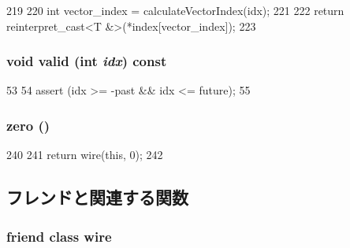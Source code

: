 \begin{DoxyCode}
219     {
220         int vector_index = calculateVectorIndex(idx);
221 
222         return reinterpret_cast<T &>(*index[vector_index]);
223     }
\end{DoxyCode}
\hypertarget{classTimeBuffer_ab099fd18174f884c6ac2f044b15a339b}{
\subsubsection[{valid}]{\setlength{\rightskip}{0pt plus 5cm}void valid (int {\em idx}) const}}
\label{classTimeBuffer_ab099fd18174f884c6ac2f044b15a339b}



\begin{DoxyCode}
53     {
54         assert (idx >= -past && idx <= future);
55     }
\end{DoxyCode}
\hypertarget{classTimeBuffer_ac9013d17b3e47b57b9b3c1bee98b218e}{
\subsubsection[{zero}]{ zero ()}}
\label{classTimeBuffer_ac9013d17b3e47b57b9b3c1bee98b218e}



\begin{DoxyCode}
240     {
241         return wire(this, 0);
242     }
\end{DoxyCode}


\subsection{フレンドと関連する関数}
\hypertarget{classTimeBuffer_a064260780ae3c86e44412c39e51c804b}{
\subsubsection[{wire}]{\setlength{\rightskip}{0pt plus 5cm}friend class {\bf wire}}}
\label{classTimeBuffer_a064260780ae3c86e44412c39e51c804b}


